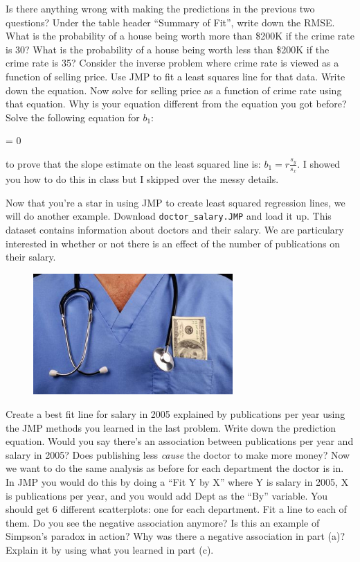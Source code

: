 \documentclass[12pt]{article}
\begin{document}
\intermediatesubproblem Is there anything wrong with making the predictions in the previous two questions?
\easysubproblem Under the table header ``Summary of Fit'', write down the RMSE.
\intermediatesubproblem What is the probability of a house being worth more than \$200K if the crime rate is 30?
\intermediatesubproblem What is the probability of a house being worth less than \$200K if the crime rate is 35?
\hardsubproblem Consider the inverse problem where crime rate is viewed as a function of selling price. Use JMP to fit a least squares line for that data. Write down the equation. Now solve for selling price as a function of crime rate using that equation. Why is your equation different from the equation you got before?
\extracreditsubproblem Solve the following equation for $b_1$:

\beqn
{} = 0
\eeqn

to prove that the slope estimate on the least squared line is: $b_1 = r\frac{s_y}{s_x}$. I showed you how to do this in class but I skipped over the messy details.
\eenum

\problem Now that you're a star in using JMP to create least squared regression lines, we will do another example. Download \texttt{doctor\_salary.JMP} and load it up. This dataset contains information about doctors and their salary. We are particulary interested in whether or not there is an effect of the number of publications on their salary.

\begin{figure}[htp]
\centering
\includegraphics[width=3in,height=1.82in]{doctor_salary.jpg}
\end{figure}
\FloatBarrier

\benum
\easysubproblem Create a best fit line for salary in 2005 explained by publications per year using the JMP methods you learned in the last problem. Write down the prediction equation.
\easysubproblem Would you say there's an association between publications per year and salary in 2005? Does publishing less \textit{cause} the doctor to make more money?
\easysubproblem Now we want to do the same analysis as before for each department the doctor is in. In JMP you would do this by doing a ``Fit Y by X'' where Y is salary in 2005, X is publications per year, and you would add Dept as the ``By'' variable. You should get 6 different scatterplots: one for each department. Fit a line to each of them. Do you see the negative association anymore? Is this an example of Simpson's paradox in action?
\intermediatesubproblem Why was there a negative association in part (a)? Explain it by using what you learned in part (c).
\eenum
\end{document}
